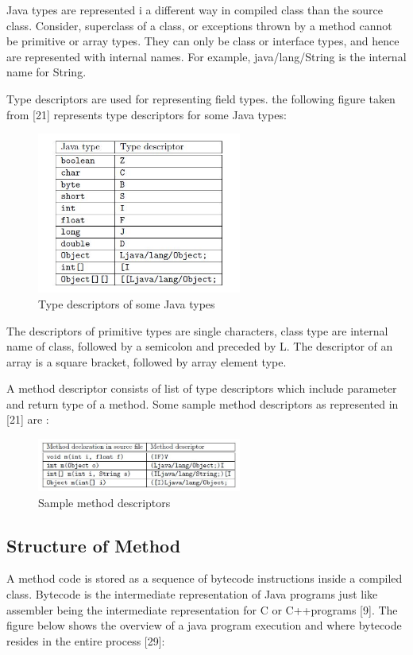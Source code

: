 Java types are represented i a different way in compiled class than the source class. Consider, superclass of a class, or exceptions thrown by a method cannot be primitive or array types. They can only be class or interface types, and hence are represented with internal names. For example, java/lang/String is the internal name for String. 

Type descriptors are used for representing field types. the following figure taken from [21] represents type descriptors for some Java types:

\begin{figure}[htb]
\centering
\includegraphics[width=0.6\textwidth]{images/type_desc.jpg}
\caption{Type descriptors of some Java types} 
\label{fig: Type descriptors of some Java types}
\end{figure} 
\break

The descriptors of primitive types are single characters, class type are internal name of class, followed by a semicolon and preceded by L. The descriptor of an array is a square bracket, followed by array element type. 

A method descriptor consists of list of type descriptors which include parameter and return type of a method. Some sample method descriptors as represented in [21] are :

\begin{figure}[htb]
\centering
\includegraphics[width=0.6\textwidth]{images/method_des.jpg}
\caption{Sample method descriptors} 
\label{fig: Sample method descriptors}
\end{figure}
\break

\subsection{Structure of Method}
A method code is stored as a sequence of bytecode instructions inside a compiled class. Bytecode is the intermediate representation of Java programs just like assembler being the intermediate representation for C or C++programs [9]. The figure below shows the overview of a java program execution and where bytecode resides in the entire process [29]: 

